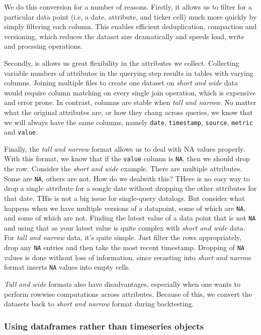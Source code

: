 \documentclass[11pt,preprint, authoryear]{elsarticle}
\numberwithin{equation}{section}
\numberwithin{figure}{section}
\numberwithin{table}{section}
\begin{document}
We do this conversion for a number of reasons. Firstly, it allows us to
filter for a particular data point (i.e, a date, attribute, and ticker
cell) much more quickly by simply filtering each column. This enables
efficient deduplication, compaction and versioning, which reduces the
dataset size dramatically and speeds load, write and procssing
operations.

Secondly, is allows us great flexibility in the attributes we collect.
Collecting variable numbers of attributes in the querying step results
in tables with varying columns. Joining multiple files to create one
dataset on \emph{short and wide} data would require column matching on
every single join operation, which is expensive and error prone. In
contrast, columns are stable when \emph{tall and narrow}. No matter what
the original attributes are, or how they chang across queries, we know
that we will always have the same columns, namely \texttt{date},
\texttt{timestamp}, \texttt{source}, \texttt{metric} and \texttt{value}.

Finally, the \emph{tall and narrow} format allows us to deal with NA
values properly. With this format, we know that if the \texttt{value}
column is \texttt{NA}, then we should drop the row. Consider the
\emph{short and wide} example. There are multiple attributes. Some are
\texttt{NA}, others are not. How do we dealwith this? THere is no easy
way to drop a single attribute for a songle date without dropping the
other attributes for that date. THis is not a big issue for single-query
datalogs. But consider what happens when we have multiple versions of a
datapoint, some of which are \texttt{NA}, and some of which are not.
Finding the latest value of a data point that is not \texttt{NA} and
using that as your latest value is quite complex with \emph{short and
wide} data. For \emph{tall and narrow} data, it's quite simple. Just
filter the rows appropriately, drop any \texttt{NA} entries and then
take the most recent timestamp. Dropping of \texttt{NA} values is done
without loss of information, since recasting into \emph{short and
narrow} format inserts \texttt{NA} values into empty cells.

\emph{Tall and wide} formats also have disadvantages, especially when
one wants to perform rowwise computations across attributes. Because of
this, we convert the datasets back to \emph{short and narrow} format
during backtesting.

\subsubsection{Using dataframes rather than timeseries
objects}\label{using-dataframes-rather-than-timeseries-objects}
\end{document}
